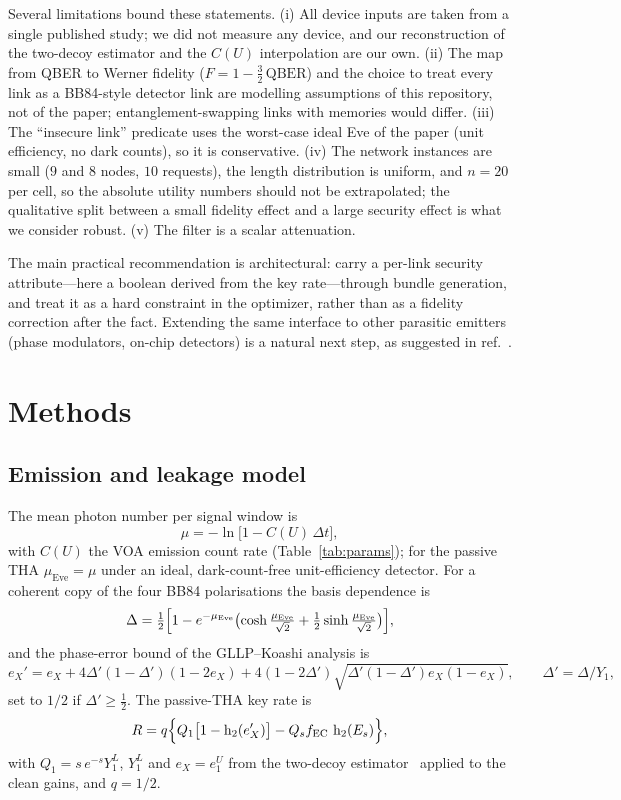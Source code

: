 \documentclass[10pt]{article}
\newcommand{\muEve}{\mu_{\mathrm{Eve}}}
\DeclareMathOperator{\hbin}{h_2}
\begin{document}
Several limitations bound these statements.
(i) All device inputs are taken from a single published study; we did not
measure any device, and our reconstruction of the two-decoy estimator and the
$C(U)$ interpolation are our own. (ii) The map from QBER to Werner fidelity
($F=1-\tfrac32\,\mathrm{QBER}$) and the choice to treat every link as a
BB84-style detector link are modelling assumptions of this repository, not of
the paper; entanglement-swapping links with memories would differ. (iii) The
``insecure link'' predicate uses the worst-case ideal Eve of the paper (unit
efficiency, no dark counts), so it is conservative. (iv) The network instances
are small ($9$ and $8$ nodes, $10$ requests), the length distribution is
uniform, and $n=20$ per cell, so the absolute utility numbers should not be
extrapolated; the qualitative split between a small fidelity effect and a large
security effect is what we consider robust. (v) The filter is a scalar
attenuation.

The main practical recommendation is architectural: carry a per-link security
attribute---here a boolean derived from the key rate---through bundle generation,
and treat it as a hard constraint in the optimizer, rather than as a fidelity
correction after the fact. Extending the same interface to other parasitic
emitters (phase modulators, on-chip detectors) is a natural next step, as
suggested in ref.~\cite{li2026voa}.

\section{Methods}
\subsection*{Emission and leakage model}
The mean photon number per signal window is
\begin{equation}
\mu=-\ln\!\bigl[1-C(U)\,\Delta t\bigr],\label{eq:mu}
\end{equation}
with $C(U)$ the VOA emission count rate (Table~\ref{tab:params}); for
the passive THA $\muEve=\mu$ under an ideal, dark-count-free unit-efficiency
detector. For a coherent copy of the four BB84 polarisations the basis
dependence is
\begin{equation}
\Delta=\tfrac12\Bigl[1-e^{-\muEve}\bigl(\cosh\tfrac{\muEve}{\sqrt2}
+\tfrac12\sinh\tfrac{\muEve}{\sqrt2}\bigr)\Bigr],\label{eq:delta}
\end{equation}
and the phase-error bound of the GLLP--Koashi analysis is
\begin{equation}
e_X'=e_X+4\Delta'(1-\Delta')(1-2e_X)+4(1-2\Delta')\sqrt{\Delta'(1-\Delta')e_X(1-e_X)},
\qquad \Delta'=\Delta/Y_1,
\end{equation}
set to $1/2$ if $\Delta'\ge\tfrac12$. The passive-THA key rate is
\begin{equation}
R=q\Bigl\{Q_1\bigl[1-\hbin(e_X')\bigr]-Q_s f_{\mathrm{EC}}\,\hbin(E_s)\Bigr\},
\end{equation}
with $Q_1=s\,e^{-s}Y_1^{L}$, $Y_1^{L}$ and $e_X=e_1^{U}$ from the two-decoy
estimator~\cite{ma2005practical} applied to the clean gains, and $q=1/2$.
\end{document}
